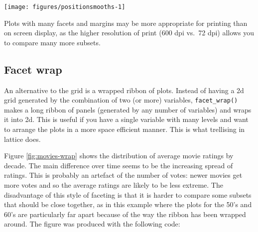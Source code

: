 \begin{Shaded}
\begin{Highlighting}[]
\NormalTok{>}\StringTok{ } \StringTok{ }
\NormalTok{+}\StringTok{   }\NormalTok{(}\NormalTok{(}  \NormalTok{, } \StringTok{ }
\NormalTok{+}\StringTok{   }\StringTok{ } 
\end{Highlighting}
\end{Shaded}

\begin{flushleft}\texttt{[image: figures/positionsmooths-1]} \end{flushleft}

Plots with many facets and margins may be more appropriate for printing
than on screen display, as the higher resolution of print (600 dpi
vs.~72 dpi) allows you to compare many more subsets.

\subsection{Facet wrap}\label{sub:facet-wrap}

An alternative to the grid is a wrapped ribbon of plots. Instead of
having a 2d grid generated by the combination of two (or more)
variables, \texttt{facet\_wrap()} makes a long ribbon of panels
(generated by any number of variables) and wraps it into 2d. This is
useful if you have a single variable with many levels and want to
arrange the plots in a more space efficient manner. This is what
trellising in lattice does.  

Figure \ref{fig:movies-wrap} shows the distribution of average movie
ratings by decade. The main difference over time seems to be the
increasing spread of ratings. This is probably an artefact of the number
of votes: newer movies get more votes and so the average ratings are
likely to be less extreme. The disadvantage of this style of faceting is
that it is harder to compare some subsets that should be close together,
as in this example where the plots for the 50's and 60's are
particularly far apart because of the way the ribbon has been wrapped
around. The figure was produced with the following code:

